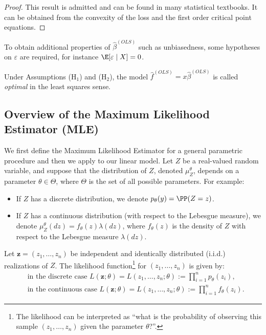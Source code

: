 \begin{proof}
This result is admitted and can be found in many statistical textbooks. It can be
obtained from the convexity of the loss and the first order critical point equations.
\end{proof}

\begin{remark}
To obtain additional properties of $\widehat{\beta}^{(OLS)}$ such as unbiasedness,
some hypotheses on $\varepsilon$ are required, for instance $\E[\varepsilon \mid X] = 0$.
\end{remark}

Under Assumptions (H$_1$) and (H$_2$), the model $\widehat{f}^{(OLS)} = x \widehat{\beta}^{(OLS)}$ is called
\emph{optimal} in the least squares sense.

\subsection{Overview of the Maximum Likelihood Estimator (MLE)}\label{sec:ch4-mle}

We first define the Maximum Likelihood Estimator for a general parametric
procedure and then we apply to our linear model. Let $Z$ be a real-valued
random variable, and suppose that the distribution of $Z$, denoted $\mu_Z^\theta$, depends
on a parameter $\theta \in \Theta$, where $\Theta$ is the set of all possible parameters. For
example:
\begin{itemize}
  \item If $Z$ has a discrete distribution, we denote $p_\theta(y) = \PP(Z = z)$.
  \item If $Z$ has a continuous distribution (with respect to the Lebesgue measure),
  we denote $\mu_Z^\theta(dz) = f_\theta(z) \lambda(dz)$, where $f_\theta(z)$ is the density of $Z$ with respect
  to the Lebesgue measure $\lambda(dz)$.
\end{itemize}

Let $\mathbf{z} = (z_1, \ldots, z_n)$ be independent and identically distributed (i.i.d.) realizations
of $Z$. The likelihood function\footnote{The likelihood can be interpreted as ``what is the probability of observing this sample $(z_1, \ldots, z_n)$ given the parameter $\theta$?''.} for $(z_1, \ldots, z_n)$ is given by:
\begin{align}
&\text{in the discrete case } L(\mathbf{z}; \theta) = L(z_1, \ldots, z_n; \theta) := \prod_{i=1}^n p_\theta(z_i),\label{eq:ch4-lik-disc}\\
&\text{in the continuous case } L(\mathbf{z}; \theta) = L(z_1, \ldots, z_n; \theta) := \prod_{i=1}^n f_\theta(z_i).\label{eq:ch4-lik-cont}
\end{align}

